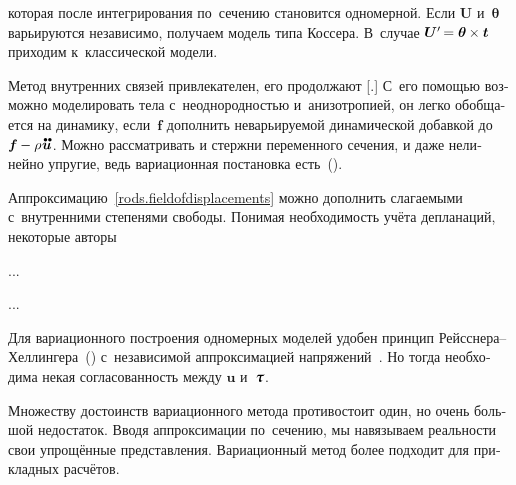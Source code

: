 \begin{otherlanguage}{russian}
\vspace{-0.1em} \noindent которая после интегрирования по~сечению становится одномерной. Если $\bm{U}$ и~$\bm{\theta}$ варьируются независимо, получаем модель типа Коссера. В~случае $\bm{U}' \hspace{-0.25ex} = \bm{\theta} \hspace{-0.1ex} \times \bm{t}$ приходим к~классической модели.

Метод внутренних связей привлекателен, его продолжают [.] С~его помощью возможно моделировать тела с~неоднородностью и~анизотропией, он легко обобщается на динамику, если~$\bm{f}$ дополнить неварьируемой динамической добавкой до~${\bm{f} \hspace{-0.1ex} - \rho \hspace{.1ex} \mathdotdotabove{\bm{u}}}$. Можно рассматривать и стержни переменного сечения, и даже нелинейно упругие, ведь вариационная постановка есть~().

Аппроксимацию~\eqref{rods.fieldofdisplacements} можно дополнить слагаемыми с~внутренними степенями свободы. Понимая необходимость учёта депланаций, некоторые авторы

...

...



Для вариационного построения одномерных моделей удобен принцип Рейсснера\hbox{--}Хеллингера~() с~независимой аппроксимацией напряжений~\cite{eliseev-models}. Но тогда необходима некая согласованность между $\bm{u}$ и~$\mathboldtau$.

Множеству достоинств вариационного метода противостоит один, но очень большой недостаток. Вводя аппроксимации по~сечению, мы навязываем реальности свои упрощённые представления. Вариационный метод более подходит для прикладных расчётов.

\end{otherlanguage}



